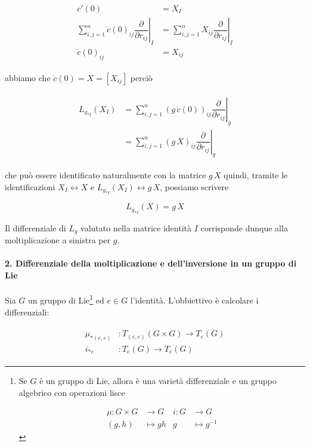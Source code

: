 \begin{align}
	\begin{split}
		c'(0) &= X_{I}\\
		\sum_{i,j=1}^{n} \dot{c}(0)_{ij} \left. \dfrac{\partial}{\partial r_{ij}} \right|_{I} &= \sum_{i,j=1}^{n} X_{ij} \left. \dfrac{\partial}{\partial r_{ij}} \right|_{I}\\
		\dot{c}(0)_{ij} &= X_{ij}
	\end{split}
\end{align}

abbiamo che $ \dot{c}(0) = X = [X_{ij}] $ perciò

\begin{align}
	\begin{split}
		L_{g_{*I}}(X_{I}) &= \sum_{i,j=1}^{n} (g \, \dot{c}(0))_{ij} \left. \dfrac{\partial}{\partial r_{ij}} \right|_{g}\\
		&= \sum_{i,j=1}^{n} (g \, X)_{ij} \left. \dfrac{\partial}{\partial r_{ij}} \right|_{g}
	\end{split}
\end{align}

che può essere identificato naturalmente con la matrice $ g \, X $ quindi, tramite le identificazioni $ X_{I} \leftrightarrow X $ e $ L_{g_{*I}}(X_{I}) \leftrightarrow g \, X $, possiamo scrivere

\begin{equation}
	L_{g_{*I}}(X) = g \, X
\end{equation}

Il differenziale di $ L_{g} $ valutato nella matrice identità $ I $ corrisponde dunque alla moltiplicazione a sinistra per $ g $.

\paragraph{2. Differenziale della moltiplicazione e dell'inversione in un gruppo di Lie}

Sia $ G $ un gruppo di Lie\footnote{%
	Se $ G $ è un gruppo di Lie, allora è una varietà differenziale e un gruppo algebrico con operazioni lisce
	
	\begin{align*}
		\mu : G \times G &\to G & i : G &\to G\nonumber\\
		(g,h) &\mapsto g h & g &\mapsto g^{-1}
	\end{align*}%
} ed $ e \in G $ l'identità. L'obbiettivo è calcolare i differenziali:

\begin{align}
	\begin{split}
		\mu_{*(e,e)} &: T_{(e,e)}(G \times G) \to T_{e}(G)\\
		i_{*e} &: T_{e}(G) \to T_{e}(G)
	\end{split}
\end{align}

